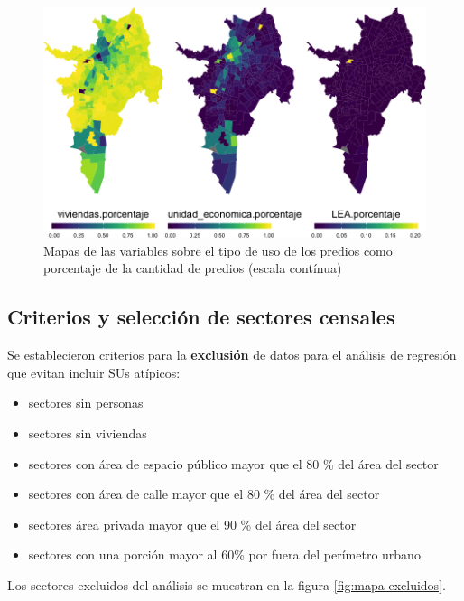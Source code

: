 \documentclass[12pt,a4paper,oneside, openany]{book}
\providecommand{\tightlist}{%
  \setlength{\itemsep}{0pt}\setlength{\parskip}{0pt}}
\theoremstyle{definition}
\theoremstyle{definition}
\theoremstyle{definition}
\theoremstyle{remark}
\begin{document}
\begin{figure}[H]

{\centering \includegraphics[width=0.8\linewidth]{tesis-unigis_files/figure-latex/mapas-usopredios-cont-1} 

}

\caption{Mapas de las variables sobre el tipo de uso de los predios como porcentaje de la cantidad de predios (escala contínua)}\label{fig:mapas-usopredios-cont}
\end{figure}

\subsection{Criterios y selección de sectores
censales}\label{criterios-y-selecciuxf3n-de-sectores-censales}

Se establecieron criterios para la \textbf{exclusión} de datos para el
análisis de regresión que evitan incluir SUs atípicos:

\begin{itemize}
\tightlist
\item
  sectores sin personas
\item
  sectores sin viviendas
\item
  sectores con área de espacio público mayor que el 80 \% del área del
  sector
\item
  sectores con área de calle mayor que el 80 \% del área del sector
\item
  sectores área privada mayor que el 90 \% del área del sector
\item
  sectores con una porción mayor al 60\% por fuera del perímetro urbano
\end{itemize}

Los sectores excluidos del análisis se muestran en la figura
\ref{fig:mapa-excluidos}.
\end{document}
